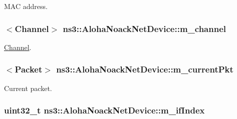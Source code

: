 M\+AC address. 

\subsubsection[{\texorpdfstring{m\+\_\+channel}{m_channel}}]{$<${\bf Channel}$>$ ns3\+::\+Aloha\+Noack\+Net\+Device\+::m\+\_\+channel\hspace{0.3cm}{\ttfamily [private]}}\hypertarget{classns3_1_1AlohaNoackNetDevice_a552286457f5d84322c6aca3ba43187a7}{}\label{classns3_1_1AlohaNoackNetDevice_a552286457f5d84322c6aca3ba43187a7}


\hyperlink{classns3_1_1Channel}{Channel}. 

\subsubsection[{\texorpdfstring{m\+\_\+current\+Pkt}{m_currentPkt}}]{$<${\bf Packet}$>$ ns3\+::\+Aloha\+Noack\+Net\+Device\+::m\+\_\+current\+Pkt\hspace{0.3cm}{\ttfamily [private]}}\hypertarget{classns3_1_1AlohaNoackNetDevice_a52e093adfac997a02fea5ad86735c142}{}\label{classns3_1_1AlohaNoackNetDevice_a52e093adfac997a02fea5ad86735c142}


Current packet. 

\subsubsection[{\texorpdfstring{m\+\_\+if\+Index}{m_ifIndex}}]{\setlength{\rightskip}{0pt plus 5cm}uint32\+\_\+t ns3\+::\+Aloha\+Noack\+Net\+Device\+::m\+\_\+if\+Index\hspace{0.3cm}{\ttfamily [private]}}\hypertarget{classns3_1_1AlohaNoackNetDevice_abc29097f76efbc9a13b536ca0db0b8d1}{}\label{classns3_1_1AlohaNoackNetDevice_abc29097f76efbc9a13b536ca0db0b8d1}



